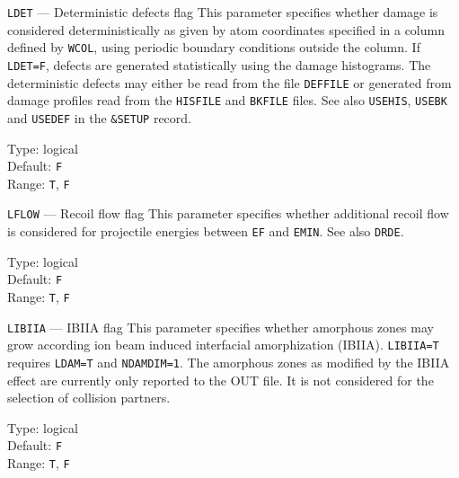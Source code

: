 \ifprivate
\begin{keydescription}{\texttt{LDET} --- Deterministic defects flag}
%
  This parameter specifies whether damage is considered deterministically as
  given by atom coordinates specified in a column defined by \texttt{WCOL},
  using periodic boundary conditions outside the column.  If \texttt{LDET=F},
  defects are generated statistically using the damage histograms.  The
  deterministic defects may either be read from the file \texttt{DEFFILE} or
  generated from damage profiles read from the \texttt{HISFILE} and
  \texttt{BKFILE} files. See also \texttt{USEHIS}, \texttt{USEBK} and
  \texttt{USEDEF} in the \texttt{\&SETUP} record.
  \begin{keytab}
    Type:    \> logical \\
    Default: \> \texttt{F} \\
    Range:   \> \texttt{T}, \texttt{F}
  \end{keytab}
\end{keydescription}
\fi

\ifprivate
\begin{keydescription}{\texttt{LFLOW} --- Recoil flow flag}
%
  This parameter specifies whether additional recoil flow is considered for
  projectile energies between \texttt{EF} and \texttt{EMIN}. See also 
  \texttt{DRDE}.
  \begin{keytab}
    Type:    \> logical \\
    Default: \> \texttt{F} \\
    Range:   \> \texttt{T}, \texttt{F}
  \end{keytab}
\end{keydescription}
\fi

\begin{keydescription}{\texttt{LIBIIA} --- IBIIA flag}
%
  This parameter specifies whether amorphous zones may grow according
  ion beam induced interfacial amorphization (IBIIA). \texttt{LIBIIA=T}
  requires \texttt{LDAM=T} and \texttt{NDAMDIM=1}. The amorphous zones as
  modified by the IBIIA effect are currently only reported to the OUT file. It
  is not considered for the selection of collision partners.
  \begin{keytab}
    Type:    \> logical \\
    Default: \> \texttt{F} \\
    Range:   \> \texttt{T}, \texttt{F}
  \end{keytab}
\end{keydescription}

